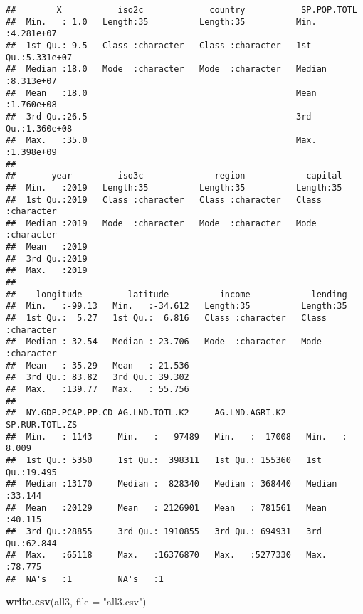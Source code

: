 \documentclass[
]{article}
\newenvironment{Shaded}{\begin{snugshade}}{\end{snugshade}}
\newcommand{\DataTypeTok}[1]{\textcolor[rgb]{0.13,0.29,0.53}{#1}}
\newcommand{\KeywordTok}[1]{\textcolor[rgb]{0.13,0.29,0.53}{\textbf{#1}}}
\newcommand{\NormalTok}[1]{#1}
\newcommand{\StringTok}[1]{\textcolor[rgb]{0.31,0.60,0.02}{#1}}
\begin{document}
\begin{verbatim}
##        X           iso2c             country           SP.POP.TOTL       
##  Min.   : 1.0   Length:35          Length:35          Min.   :4.281e+07  
##  1st Qu.: 9.5   Class :character   Class :character   1st Qu.:5.331e+07  
##  Median :18.0   Mode  :character   Mode  :character   Median :8.313e+07  
##  Mean   :18.0                                         Mean   :1.760e+08  
##  3rd Qu.:26.5                                         3rd Qu.:1.360e+08  
##  Max.   :35.0                                         Max.   :1.398e+09  
##                                                                          
##       year         iso3c              region            capital         
##  Min.   :2019   Length:35          Length:35          Length:35         
##  1st Qu.:2019   Class :character   Class :character   Class :character  
##  Median :2019   Mode  :character   Mode  :character   Mode  :character  
##  Mean   :2019                                                           
##  3rd Qu.:2019                                                           
##  Max.   :2019                                                           
##                                                                         
##    longitude         latitude          income            lending         
##  Min.   :-99.13   Min.   :-34.612   Length:35          Length:35         
##  1st Qu.:  5.27   1st Qu.:  6.816   Class :character   Class :character  
##  Median : 32.54   Median : 23.706   Mode  :character   Mode  :character  
##  Mean   : 35.29   Mean   : 21.536                                        
##  3rd Qu.: 83.82   3rd Qu.: 39.302                                        
##  Max.   :139.77   Max.   : 55.756                                        
##                                                                          
##  NY.GDP.PCAP.PP.CD AG.LND.TOTL.K2     AG.LND.AGRI.K2    SP.RUR.TOTL.ZS  
##  Min.   : 1143     Min.   :   97489   Min.   :  17008   Min.   : 8.009  
##  1st Qu.: 5350     1st Qu.:  398311   1st Qu.: 155360   1st Qu.:19.495  
##  Median :13170     Median :  828340   Median : 368440   Median :33.144  
##  Mean   :20129     Mean   : 2126901   Mean   : 781561   Mean   :40.115  
##  3rd Qu.:28855     3rd Qu.: 1910855   3rd Qu.: 694931   3rd Qu.:62.844  
##  Max.   :65118     Max.   :16376870   Max.   :5277330   Max.   :78.775  
##  NA's   :1         NA's   :1
\end{verbatim}

\begin{Shaded}
\begin{Highlighting}[]
\KeywordTok{write.csv}\NormalTok{(all3, }\DataTypeTok{file =} \StringTok{"all3.csv"}\NormalTok{)}
\end{Highlighting}
\end{Shaded}
\end{document}
